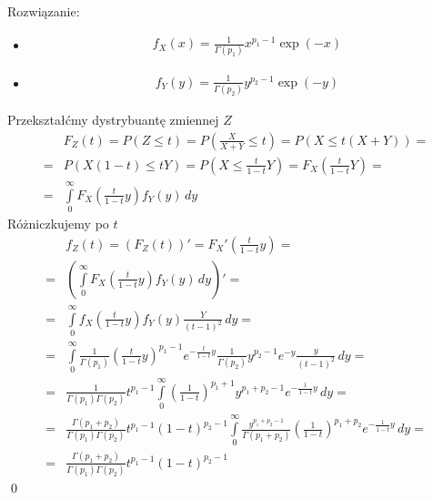 Rozwiązanie:
\begin{itemize}
\item 
\begin{gather*}
f_X(x)=\frac{1}{\Gamma(p_1)}x^{p_1-1}\exp \left(-x\right)
\end{gather*}
\item 
\begin{gather*}
f_Y(y)=\frac{1}{\Gamma(p_2)}y^{p_2-1}\exp \left(-y\right)
\end{gather*}
\end{itemize}
Przekształćmy dystrybuantę zmiennej $ Z $
\begin{align*}
&F_Z(t)=
P\left(Z\le t\right)=
P\left(\frac{X}{X+Y}\le t\right)=
P\left(X\le t(X+Y)\right)
=\\=&
P\left(X(1-t)\le tY\right)=
P\left(X\le \frac{t}{1-t}Y\right)=F_X\left(\frac{t}{1-t}Y\right)
=\\=&
\int\limits_{0}^{\infty }F_X\left(\frac{t}{1-t}y\right)f_Y(y)\,dy
\end{align*}
Różniczkujemy po $ t $
\begin{align*}
&f_Z(t)=\left(F_Z(t)\right)'=F_X'\left(\frac{t}{1-t}y\right)
=\\=&
\left(\int\limits_{0}^{\infty }F_X\left(\frac{t}{1-t}y\right)f_Y(y)\,dy\right)'
=\\=&
\int\limits_{0}^{\infty }f_X\left(\frac{t}{1-t}y\right)f_Y(y)\frac{Y}{(t-1)^2}\,dy
=\\=&
\int\limits_{0}^{\infty }
\frac{1}{\Gamma(p_1)}
\left(\frac{t}{1-t}y\right)^{p_1-1}
e^{-\frac{t}{1-t}y}
\frac{1}{\Gamma(p_2)}
y^{p_2-1}
e^{-y}
\frac{y}{(t-1)^2}
\,dy
=\\=&
\frac{1}{\Gamma(p_1)\Gamma(p_2)}
t^{p_1-1}
\int\limits_{0}^{\infty }
\left(\frac{1}{1-t}\right)^{p_1+1}
y^{p_1+p_2-1}
e^{-\frac{1}{1-t}y}
\,dy
=\\=&
\frac{\Gamma(p_1+p_2)}{\Gamma(p_1)\Gamma(p_2)}
t^{p_1-1}
\left(1-t\right)^{p_2-1}
\int\limits_{0}^{\infty }
\frac{y^{p_1+p_2-1}}{\Gamma(p_1+p_2)}
\left(\frac{1}{1-t}\right)^{p_1+p_2}
e^{-\frac{1}{1-t}y}
\,dy
=\\=&
\frac{\Gamma(p_1+p_2)}{\Gamma(p_1)\Gamma(p_2)}
t^{p_1-1}
\left(1-t\right)^{p_2-1}
\end{align*}\qed



